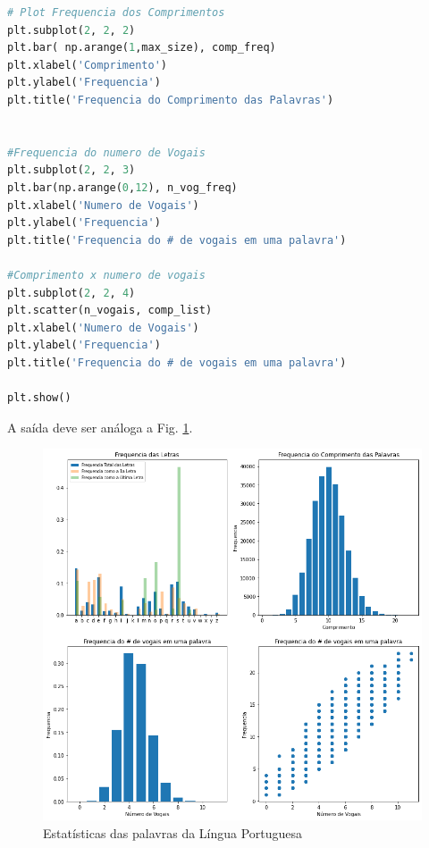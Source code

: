 \begin{lstlisting}[language=Python, frame=lines,basicstyle=\footnotesize, caption={Estatísticas das palavras da Lingua Portuguesa}, label={lst:est-palavras}]
# Plot Frequencia dos Comprimentos
plt.subplot(2, 2, 2)
plt.bar( np.arange(1,max_size), comp_freq)
plt.xlabel('Comprimento')
plt.ylabel('Frequencia')
plt.title('Frequencia do Comprimento das Palavras')


#Frequencia do numero de Vogais
plt.subplot(2, 2, 3)
plt.bar(np.arange(0,12), n_vog_freq)
plt.xlabel('Numero de Vogais')
plt.ylabel('Frequencia')
plt.title('Frequencia do # de vogais em uma palavra')

#Comprimento x numero de vogais
plt.subplot(2, 2, 4)
plt.scatter(n_vogais, comp_list)
plt.xlabel('Numero de Vogais')
plt.ylabel('Frequencia')
plt.title('Frequencia do # de vogais em uma palavra')

plt.show()

\end{lstlisting}

A saída deve ser análoga a Fig. \ref{fig:letras}.

\begin{figure}[h!]
\centering
\includegraphics[scale=0.4]{Images/letras.png}
\caption{Estatísticas das palavras da Língua Portuguesa}\label{fig:letras}
\end{figure}



